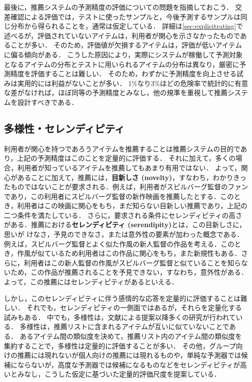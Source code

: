 最後に，推薦システムの予測精度の評価についての問題を指摘しておこう．
交差確認による評価では，テストに使ったサンプルと，今後予測するサンプルは同じ分布から得られることを，通常は仮定している．
詳細は\ref{sec:explicitrating}で述べるが，評価されていないアイテムは，利用者が関心を示さなかったものであることが多い．
そのため，評価値が欠損するアイテムは，評価が低いアイテムに偏る傾向がある．
こうした原因により，実際にシステムが稼働して予測対象となるアイテムの分布とテストに用いられるアイテムの分布は異なり，厳密に予測精度を評価することは難しい．
そのため，わずかに予測精度を向上させる試みは実用的には利益がないことが多い．
1\%なり3\%ほどの危険率で統計的に有意な差がなければ，ほぼ同等の予測精度とみなし，他の規準を重視して推薦システムを設計すべきである．

\subsection{多様性・セレンディピティ}

利用者が関心を持つであろうアイテムを推薦することは推薦システムの目的であり，上記の予測精度はこのことを定量的に評価する．
それに加えて，多くの場合，利用者が知っているアイテムを推薦してもあまり有用ではない．
よって，関心があることに加えて，推薦には，\textbf{目新しさ (novelty)}，すなわち，わかりきったものではないことが要求される．例えば，利用者がスピルバーグ監督のファンであり，この利用者にスピルバーグ監督の新作映画を推薦したとする．このとき，利用者はこの映画に関心をもち，まだ知らない目新しい推薦であり，上記の二つ条件を満たしている．
さらに，要求される条件にセレンディピティの高さがある．推薦における\textbf{セレンディピティ (serendipity)}とは，この目新しさに，思いが
けなさ，予見のできなさ，または意外性の要素が加わった概念である．
例えば，スピルバーグ監督とよく似た作風の新人監督の作品を考える．このとき，作風が似ているため利用者はこの作品に関心をもち，また新規性もある．さらに，利用者はこの新人監督の作風がスピルバーグ監督と似ていることを知らないため，この作品が推薦されることを予見できない，すなわち，意外性がある．よって，この推薦にはセレンディピティがあるといえる．

しかし，このセレンディピティに伴う感情的な応答を定量的に評価することは難しい．
それでも，セレンディピティの一側面ではあるが，それらを定量化する試みもある．
中でも，多様性\cite{misc:033}は，文献\cite{www:05:01}による提案以降多くの研究が行われている．
多様性は，推薦リストに含まれるアイテムが互いに似ていないことである．
あるアイテム間の類似度を決めて，推薦リスト内のアイテム間の類似度を集約することで，多様性は定量的に評価することが多い．
その他，グループ向けの推薦には現れないが個人向けの推薦には現れるもの\cite{jacm:04:01}や，単純な予測器では候補にならないが，高度な予測器では候補になるもの\cite{trjsai:07:03}などをセレンディピティが高いとみなし，こうした仮定に基づいた定量的評価尺度を提案している．

